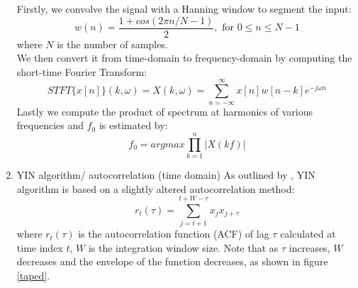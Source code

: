\begin{enumerate}[label=\textbf{\arabic*})]
    Firstly, we convolve the signal with a Hanning window to segment the input:
    \[w(n) = \frac{1+cos(2\pi n/N-1)}{2}, \text{ for } 0 \leq n \leq N-1\] where $N$ is the number of samples.\\
    We then convert it from time-domain to frequency-domain by computing the short-time Fourier Transform:
    \[STFT \{x[n]\}(k,\omega) = X(k,\omega )= \sum _{n=-\infty }^{\infty }x[n]w[n-k]e^{-j\omega n}\]
    Lastly we compute the product of spectrum at harmonics of various frequencies and $f_0$ is estimated by:
    \[f_0 = argmax\prod_{k=1}^{n}|X(kf)|\] 

    \item YIN algorithm/ autocorrelation (time domain)
    As outlined by \cite{yin}, YIN algorithm is based on a slightly altered autocorrelation method:
    \[r_t(\tau)=\sum_{j=t+1}^{t+W-\tau}x_j x_{j+\tau}\]
    where $r_t(\tau)$ is the autocorrelation function (ACF) of lag $\tau$ calculated at time index $t$, $W$ is the integration
    window size. Note that as $\tau$ increases, $W$ decreases and the envelope of the function decreases, as shown in figure 
    \cref{taped}.


\end{enumerate}
